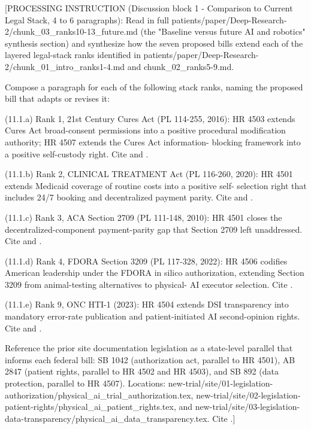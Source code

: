 
[PROCESSING INSTRUCTION (Discussion block 1 - Comparison to Current
Legal Stack, 4 to 6 paragraphs): Read in full
patients/paper/Deep-Research-2/chunk\_03\_ranks10-13\_future.md (the
"Baseline versus future AI and robotics" synthesis section) and
synthesize how the seven proposed bills extend each of the layered
legal-stack ranks identified in
patients/paper/Deep-Research-2/chunk\_01\_intro\_ranks1-4.md and
chunk\_02\_ranks5-9.md.

Compose a paragraph for each of the following stack ranks, naming the
proposed bill that adapts or revises it:

(11.1.a) Rank 1, 21st Century Cures Act (PL 114-255, 2016): HR 4503
extends Cures Act broad-consent permissions into a positive procedural
modification authority; HR 4507 extends the Cures Act information-
blocking framework into a positive self-custody right. Cite
\cite{rank1_cures_act_2016} and
\cite{onc_cures_act_final_rule_page}.

(11.1.b) Rank 2, CLINICAL TREATMENT Act (PL 116-260, 2020): HR 4501
extends Medicaid coverage of routine costs into a positive self-
selection right that includes 24/7 booking and decentralized payment
parity. Cite \cite{rank2_clinical_treatment_act_2020} and
\cite{cms_ncd_3101_routine_costs}.

(11.1.c) Rank 3, ACA Section 2709 (PL 111-148, 2010): HR 4501 closes
the decentralized-component payment-parity gap that Section 2709
left unaddressed. Cite \cite{rank3_aca_clinical_trials_2010} and
\cite{usc_300gg8_clinical_trials}.

(11.1.d) Rank 4, FDORA Section 3209 (PL 117-328, 2022): HR 4506
codifies American leadership under the FDORA in silico authorization,
extending Section 3209 from animal-testing alternatives to physical-
AI executor selection. Cite \cite{rank4_fdora_fda_modernization_2022}.

(11.1.e) Rank 9, ONC HTI-1 (2023): HR 4504 extends DSI transparency
into mandatory error-rate publication and patient-initiated AI
second-opinion rights. Cite \cite{rank9_onc_hti1_2023} and
\cite{hti1_dsi_fact_sheet_2023}.

Reference the prior site documentation legislation as a state-level
parallel that informs each federal bill: SB 1042 (authorization act,
parallel to HR 4501), AB 2847 (patient rights, parallel to HR 4502
and HR 4503), and SB 892 (data protection, parallel to HR 4507).
Locations:
new-trial/site/01-legislation-authorization/physical\_ai\_trial\_authorization.tex,
new-trial/site/02-legislation-patient-rights/physical\_ai\_patient\_rights.tex,
and new-trial/site/03-legislation-data-transparency/physical\_ai\_data\_transparency.tex.
Cite \cite{kawchak_2026_19176370}.]


